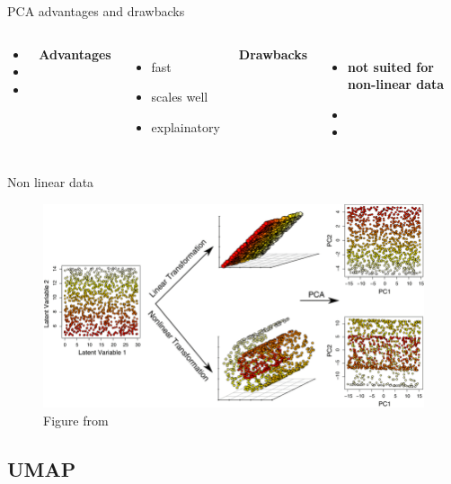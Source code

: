 \documentclass{irdbeamer}
\let\oldcite=\cite
\renewcommand{\cite}[1]{\textcolor[rgb]{.5,.5,.7}{\oldcite{#1}}}
\begin{document}
\begin{frame}{PCA advantages and drawbacks}
\begin{columns}
\begin{column}{0.05\textwidth}
\begin{itemize}
    \item[] 
    \item[] 
    \item[] 
\end{itemize}
\end{column}
        \textbf{Advantages}
        \begin{itemize}
            \item<1-> fast
            \item<2-> scales well
            \item<3-> explainatory
        \end{itemize}
        \textbf{Drawbacks}
        \begin{itemize}
            \item<4-> \textbf{not suited for non-linear data}
            \item[] 
            \item[] 
        \end{itemize}
\end{columns}
\end{frame}

\begin{frame}{Non linear data}
    \begin{figure}
    \centering
    \includegraphics[width=.7\textwidth]{./figs/non_linearity.png}
    \caption{\tiny Figure from \cite{du2019dimensionality}}
    \end{figure}
\end{frame}

\subsection{UMAP}
\end{document}

